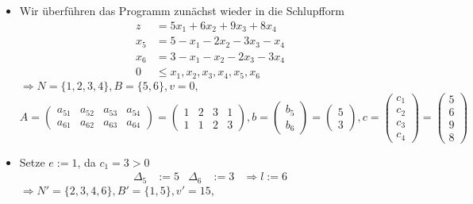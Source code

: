 \documentclass[a4paper,10pt]{article}
\begin{document}
\begin{enumerate}
\begin{itemize}
        \item   Wir überführen das Programm zunächst wieder in die Schlupfform
                \begin{align*}
                    z   &=     5x_1 + 6x_2 + 9x_3 + 8x_4 \\
                    x_5 &= 5 -  x_1 - 2x_2 - 3x_3 -  x_4 \\
                    x_6 &= 3 -  x_1 -  x_2 - 2x_3 - 3x_4 \\
                      0 &\leq x_1, x_2, x_3, x_4, x_5, x_6 
                \end{align*}
                $\Rightarrow N = \{1,2,3,4\}, B = \{5,6\}, v = 0,$
                \[
                 A = \begin{pmatrix}
                        a_{51} & a_{52} & a_{53} & a_{54}\\
                        a_{61} & a_{62} & a_{63} & a_{64}
                     \end{pmatrix}
                   = \begin{pmatrix}
                        1 & 2 & 3 & 1 \\
                        1 & 1 & 2 & 3
                     \end{pmatrix}, 
                 b = \begin{pmatrix}b_5 \\ b_6 \end{pmatrix} 
                   = \begin{pmatrix}5 \\ 3 \end{pmatrix},
                 c = \begin{pmatrix}c_1 \\ c_2 \\ c_3 \\ c_4\end{pmatrix} 
                   = \begin{pmatrix}5 \\ 6 \\ 9 \\ 8 \end{pmatrix}
                \]
        \item   Setze $e := 1$, da $c_1 = 3 > 0$
                \begin{align*}
                    \Delta_5 &:= 5 & \Delta_6 &:= 3 & \Rightarrow l := 6
                \end{align*}
                $\Rightarrow N' = \{2,3,4,6\}, B' = \{1,5\}, v' = 15,$
                \[
\]
\end{itemize}
\end{enumerate}
\end{document}
